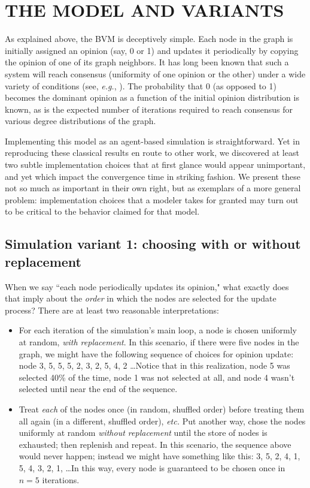 
\section{THE MODEL AND VARIANTS}

As explained above, the BVM is deceptively simple. Each node in the graph is
initially assigned an opinion (say, 0 or 1) and updates it periodically by
copying the opinion of one of its graph neighbors. It has long been known that
such a system will reach consensus (uniformity of one opinion or the other)
under a wide variety of conditions (see, \textit{e.g.},
\cite{sood_voter_2005}). The probability that 0 (as opposed to 1) becomes the
dominant opinion as a function of the initial opinion distribution is known,
as is the expected number of iterations required to reach consensus for
various degree distributions of the graph.

Implementing this model as an agent-based simulation is straightforward. Yet
in reproducing these classical results en route to other work, we discovered
at least two subtle implementation choices that at first glance would appear
unimportant, and yet which impact the convergence time in striking fashion. We
present these not so much as important in their own right, but as exemplars of
a more general problem: implementation choices that a modeler takes for
granted may turn out to be critical to the behavior claimed for that model.

\subsection{Simulation variant 1: choosing with or without replacement}

When we say ``each node periodically updates its opinion," what exactly does
that imply about the \textit{order} in which the nodes are selected for the
update process? There are at least two reasonable interpretations:

\begin{itemize}
\itemsep.1em

\item For each iteration of the simulation's main loop, a node is chosen
uniformly at random, \textit{with replacement}. In this scenario, if there
were five nodes in the graph, we might have the following sequence of choices
for opinion update: node 3, 5, 5, 5, 2, 3, 2, 5, 4, 2 \dots Notice that in
this realization, node 5 was selected 40\% of the time, node 1 was
not selected at all, and node 4 wasn't selected until near the end of the
sequence.

\item Treat \textit{each} of the nodes once (in random, shuffled order) before
treating them all again (in a different, shuffled order), \textit{etc.} Put
another way, chose the nodes uniformly at random \textit{without replacement}
until the store of nodes is exhausted; then replenish and repeat. In this
scenario, the sequence above would never happen; instead we might have
something like this: 3, 5, 2, 4, 1, 5, 4, 3, 2, 1, \dots In this way, every
node is guaranteed to be chosen once in $n=5$ iterations.

\end{itemize}

